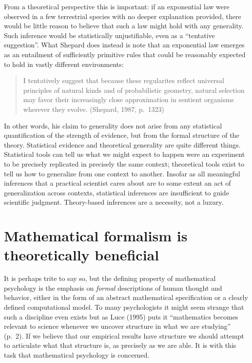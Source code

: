 \documentclass[
  english,
  doc]{apa6}
\begin{document}
From a theoretical perspective this is important: if an exponential law were observed in a few terrestrial species with no deeper explanation provided, there would be little reason to believe that such a law might hold with any generality. Such inference would be statistically unjustifiable, even as a \enquote{tentative suggestion}. What Shepard does instead is note that an exponential law emerges as an entailment of sufficiently primitive rules that could be reasonably expected to hold in vastly different environments:

\begin{quote}
I tentatively suggest that because these regularites reflect universal principles of natural kinds and of probabilistic geometry, natural selection may favor their increasingly close approximation in sentient organisms wherever they evolve. (Shepard, 1987, p.~1323)
\end{quote}

\noindent
In other words, his claim to generality does not arise from any statistical quantification of the strength of evidence, but from the formal structure of the theory. Statistical evidence and theoretical generality are quite different things. Statistical tools can tell us what we might expect to happen were an experiment to be precisely replicated in precisely the same context; theoretical tools exist to tell us how to generalize from one context to another. Insofar as all meaningful inferences that a practical scientist cares about are to some extent an act of generalization across contexts, statistical inferences are insufficient to guide scientific judgment. Theory-based inferences are a necessity, not a luxury.

\hypertarget{mathematical-formalism-is-theoretically-beneficial}{%
\section{Mathematical formalism is theoretically beneficial}\label{mathematical-formalism-is-theoretically-beneficial}}

\noindent
It is perhaps trite to say so, but the defining property of mathematical psychology is the emphasis on \emph{formal} descriptions of human thought and behavior, either in the form of an abstract mathematical specification or a clearly defined computational model. To many psychologists it might seem strange that such a discipline even exists but as Luce (1995) puts it \enquote{mathematics becomes relevant to science whenever we uncover structure in what we are studying} (p.~2). If we believe that our empirical results have structure we should attempt to articulate what that structure is, as precisely as we are able. It is with this task that mathematical psychology is concerned.
\end{document}
